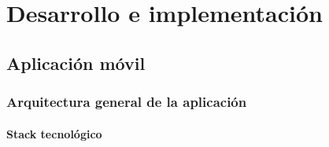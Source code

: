 %
%

\chapter{Desarrollo e implementación}

\section{Aplicación móvil}

\subsection{Arquitectura general de la aplicación}

\subsubsection{Stack tecnológico}

